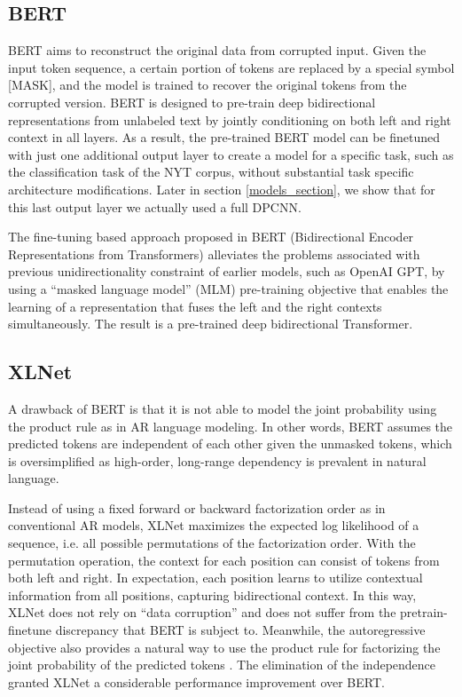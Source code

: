\documentclass{article}
\begin{document}
\subsection{BERT}

BERT aims to reconstruct the original data from corrupted input. Given the input token sequence, a certain portion of tokens are replaced by a special symbol [MASK], and the model is trained to recover the original tokens from the corrupted version. BERT is designed to pre-train deep bidirectional representations from unlabeled text by jointly conditioning on both left and right context in all layers. As a result, the pre-trained BERT model can be finetuned with just one additional output layer to create a model for a specific task, such as the classification task of the NYT corpus, without substantial task specific architecture modifications. Later in section \ref{models_section}, we show that for this last output layer we actually used a full DPCNN.

The fine-tuning based approach proposed in BERT (Bidirectional Encoder Representations from Transformers) alleviates the problems associated with previous unidirectionality constraint of earlier models, such as OpenAI GPT\cite{improving_language_understanding_ref}, by using a “masked language model” (MLM) pre-training objective that enables the learning of a representation that fuses the left and the right contexts simultaneously. The result is a pre-trained deep bidirectional Transformer.

\subsection{XLNet}

A drawback of BERT is that it is not able to model the joint probability using the product rule as in AR language modeling. In other words, BERT assumes the predicted tokens are independent of each other given the unmasked tokens, which is oversimplified as high-order, long-range dependency is prevalent in natural language.

Instead of using a fixed forward or backward factorization order as in conventional AR models, XLNet maximizes the expected log likelihood of a sequence, i.e. all possible permutations of the factorization order. With the  permutation operation, the context for each position can consist of tokens from both left and right. In expectation, each position learns to utilize contextual information from all positions, capturing bidirectional context. In this way, XLNet does not rely on “data corruption” and does not suffer from the pretrain-finetune discrepancy that BERT is subject to. Meanwhile, the autoregressive objective also provides a natural way to use the product rule for factorizing the joint probability of the predicted tokens . The elimination of the independence granted XLNet a considerable performance improvement over BERT.
\end{document}
